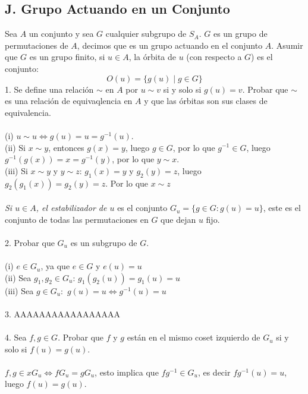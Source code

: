 \documentclass{article}
\begin{document}
\subsection*{J. Grupo Actuando en un Conjunto}
Sea $A$ un conjunto y sea $G$ cualquier subgrupo de $S_A$. $G$ es un grupo de permutaciones de $A$, decimos que es un grupo actuando en el conjunto $A$. Asumir que $G$ es un grupo finito, si $u \in A$, la órbita de $u$ (con respecto a $G$) es el conjunto:
\begin{equation*}
    O(u)= \{g(u) \mid g \in G \}
\end{equation*}
1. Se define una relación $\sim$ en $A$ por $u \sim v$ si y solo si $g(u)=v$. Probar que $\sim$ es una relación de equivaqlencia en $A$ y que las órbitas son sus clases de equivalencia.
\\
\\
(i) $u \sim u \Longleftrightarrow g(u)=u=g^{-1}(u)$.
\\
(ii) Si $x \sim y$, entonces $g(x)=y$, luego $g \in G$, por lo que $g^{-1} \in G$, luego $g^{-1}(g(x))=x=g^{-1}(y)$, por lo que $y \sim x$.
\\
(iii) Si $x \sim y$ y $y \sim z$: $g_{1}(x)=y$ y $g_{2}(y)=z$, luego $g_{2}(g_{1}(x))=g_{2}(y)=z$. Por lo que $x \sim z$
\\
\\
\textit{Si $u \in A$, el estabilizador de $u$} es el conjunto $G_{u}=\{g \in G: g(u)=u \}$, este es el conjunto de todas las permutaciones en $G$ que dejan $u$ fijo.
\\
\\
2. Probar que $G_{u}$ es un subgrupo de $G$.
\\
\\
(i) $e \in G_{u}$, ya que $e \in G$ y $e(u)=u$
\\
(ii) Sea $g_1,g_2 \in G_u$: $g_{1}(g_{2}(u))=g_1(u)=u$
\\
(iii) Sea $g \in G_{u}:$ $g(u)=u \Longleftrightarrow g^{-1}(u)=u$ 
\\
\\
3. AAAAAAAAAAAAAAAAA
\\
\\
4. Sea $f,g \in G$. Probar que $f$ y $g$ están en el mismo coset izquierdo de $G_u$ si y solo si $f(u)=g(u)$.
\\
\\
$f,g \in xG_{u} \Longleftrightarrow fG_{u}=gG_{u}$, esto implica que $fg^{-1} \in G_{u}$, es decir $fg^{-1}(u)=u$, luego $f(u)=g(u)$.
\\
\\
\end{document}
